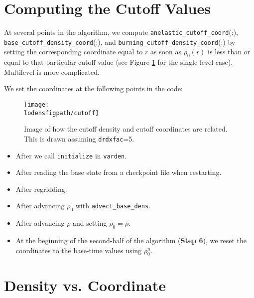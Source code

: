 \section{Computing the Cutoff Values}

At several points in the algorithm, we compute {\tt anelastic\_cutoff\_coord}(:), 
{\tt base\_cutoff\_density\_coord}(:), and {\tt burning\_cutoff\_density\_coord}(:) by 
setting the corresponding coordinate equal to $r$ as soon as $\rho_0(r)$ is less than 
or equal to that particular cutoff value (see Figure \ref{Fig:Cutoff} for the
single-level case).  Multilevel is more complicated.

We set the coordinates at the following points in the code:
\begin{figure}[hpb]
\centering
\texttt{[image: \\lodensfigpath/cutoff]}\hspace{0.2in}
\begin{minipage}[b]{5.0in}
\caption[Relation between cutoff density and cutoff coordinates]
{Image of how the cutoff density and cutoff coordinates
are related.  This is drawn assuming {\tt drdxfac}=5.\vspace{2em}}
\end{minipage}
\label{Fig:Cutoff}
\end{figure}

\begin{itemize}

\item After we call {\tt initialize} in {\tt varden}.

\item After reading the base state from a checkpoint file when restarting.

\item After regridding.

\item After advancing $\rho_0$ with {\tt advect\_base\_dens}.

\item After advancing $\rho$ and setting $\rho_0 = \overline{\rho}$.

\item At the beginning of the second-half of the algorithm ({\bf Step 6}), we reset
  the coordinates to the base-time values using $\rho_0^n$.

\end{itemize}

\section{Density vs. Coordinate}

